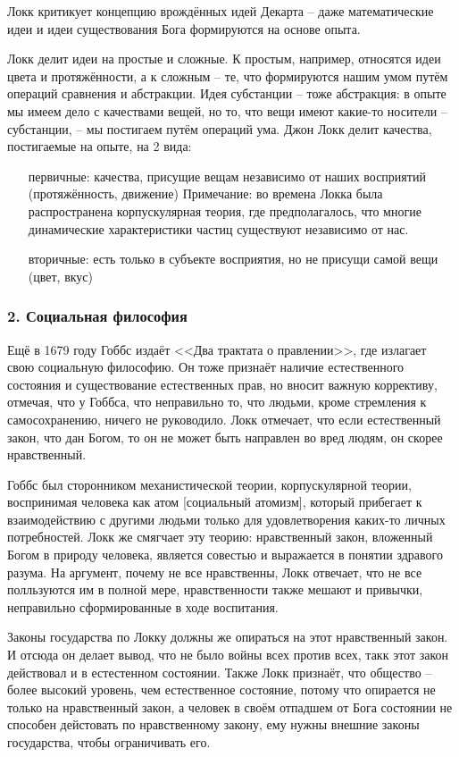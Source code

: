 \documentclass[a4paper, 12pt]{book} %
\begin{document}
Локк критикует концепцию врождённых идей Декарта -- даже математические идеи и идеи существования Бога формируются на основе опыта.

Локк делит идеи на простые и сложные. К простым, например, относятся идеи цвета и протяжённости, а к сложным -- те, что формируются нашим умом путём операций сравнения и абстракции. Идея субстанции -- тоже абстракция: в опыте мы имеем дело с качествами вещей, но то, что вещи имеют какие-то носители -- субстанции, -- мы постигаем путём операций ума.
\newpage
Джон Локк делит качества, постигаемые на опыте, на 2 вида:
\begin{itemize}
\item[первичные:] качества, присущие вещам независимо от наших восприятий (протяжённость, движение)
Примечание: во времена Локка была распространена корпускулярная теория, где предполагалось, что многие динамические характеристики частиц существуют независимо от нас.
\item[вторичные:] есть только в субъекте восприятия, но не присущи самой вещи (цвет, вкус) 
\end{itemize}

\subsubsection*{2. Социальная философия}
Ещё в 1679 году Гоббс издаёт <<Два трактата о правлении>>, где излагает свою социальную философию. Он тоже признаёт наличие естественного состояния и существование естественных прав, но вносит важную коррективу, отмечая, что у Гоббса, что неправильно то, что людьми, кроме стремления к самосохранению, ничего не руководило. Локк отмечает, что если естественный закон, что дан Богом, то он не может быть направлен во вред людям, он скорее нравственный. 

Гоббс был сторонником механистической теории, корпускулярной теории, воспринимая человека как атом [социальный атомизм], который прибегает к взаимодействию с другими людьми только для удовлетворения каких-то личных потребностей. Локк же смягчает эту теорию: нравственный закон, вложенный Богом в природу человека, является совестью и выражается в понятии здравого разума. На аргумент, почему не все нравственны, Локк отвечает, что не все полльзуются им в полной мере, нравственности также мешают и привычки, неправильно сформированные в ходе воспитания.

Законы государства по Локку должны же опираться на этот нравственный закон. И отсюда он делает вывод, что не было войны всех против всех, такк этот закон действовал и в естестенном состоянии. Также Локк признаёт, что общество -- более высокий уровень, чем естественное состояние, потому что опирается не только на нравственный закон, а человек в своём отпадшем от Бога состоянии не способен дейстовать по нравственному закону, ему нужны внешние законы государства, чтобы ограничивать его.
\end{document}
